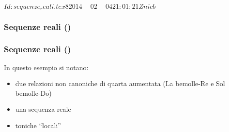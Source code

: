 %
%
\svnInfo $Id: sequenze_reali.tex 8 2014-02-04 21:01:21Z nicb $

\setcounter{ms}{0}
\begin{frame}
    \frametitle{Sequenze reali ()}

    \begin{center}
        \begin{figure}
            \caption{}
        \end{figure}
    \end{center}

\end{frame}

\begin{frame}
    \frametitle{Sequenze reali ()}

    In questo esempio si notano:

    \begin{itemize}

        \item due relazioni non canoniche di quarta aumentata
            (La bemolle-Re e Sol bemolle-Do)

        \item una sequenza reale

        \item toniche ``locali''

    \end{itemize}

\end{frame}

